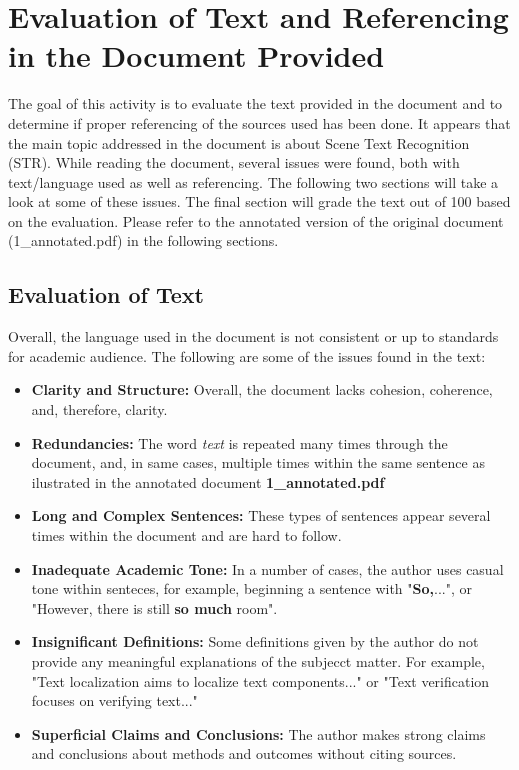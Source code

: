 \chapter*{Evaluation of Text and Referencing in the Document Provided}
\label{chap1}

The goal of this activity is to evaluate the text provided in the document and to determine if proper referencing of the sources used has been done. It appears that the main topic addressed in the document is about Scene Text Recognition (STR). While reading the document, several issues were found, both with text/language used as well as referencing. The following two sections will take a look at some of these issues. The final section will grade the text out of 100 based on the evaluation. Please refer to the annotated version of the original document (1\_annotated.pdf) in the following sections.

\newpage

\section*{Evaluation of Text} 
Overall, the language used in the document is not consistent or up to standards for academic audience. The following are some of the issues found in the text:
\begin{itemize}
    \item \textbf{Clarity and Structure:} Overall, the document lacks cohesion, coherence, and, therefore, clarity. 
    \item  \textbf{Redundancies:} The word \textit{text} is repeated many times through the document, and, in same cases, multiple times within the same sentence as ilustrated in the annotated document \textbf{1\_annotated.pdf}  
    \item  \textbf{Long and Complex Sentences:} These types of sentences appear several times within the document and are hard to follow. 
    \item  \textbf{Inadequate Academic Tone:} In a number of cases, the author uses casual tone within senteces, for example, beginning a sentence with "\textbf{So,}...", or "However, there is still \textbf{so much} room". 
\item  \textbf{Insignificant Definitions:} Some definitions given by the author
do not provide any meaningful explanations of the subjecct matter. For example, "Text localization aims to localize text components..." or "Text verification focuses on verifying text..."
\item  \textbf{Superficial Claims and Conclusions:} The author makes strong claims and conclusions about methods and outcomes without citing sources.

\end{itemize} 

